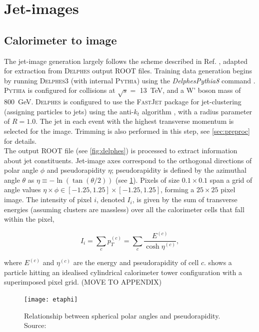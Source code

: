 \documentclass{report}
\newcommand{\pkg}[1]{\textsc{#1}}
\begin{document}
\section{Jet-images}
\subsection{Calorimeter to image}
The jet-image generation largely follows the scheme described in Ref. \cite{de2015jet}, adapted for extraction from \pkg{Delphes} output \pkg{ROOT} files. Training data generation begins by running \pkg{Delphes}3 (with internal \pkg{Pythia}) using the \textit{DelphesPythia8} command \cite{workbook}. \pkg{Pythia} is configured for collisions at $\sqrt{s} =$ \SI{13}{\tera\electronvolt}, and a W' boson mass of \SI{800}{\giga\electronvolt}. \pkg{Delphes} is configured to use the \pkg{FastJet} \cite{fastjet} package for jet-clustering (assigning particles to jets) using the anti-$k_t$ algorithm \cite{antikt}, with a radius parameter of $R=1.0$. The jet in each event with the highest transverse momentum is selected for the image. Trimming is also performed in this step, see \cref{sec:preproc} for details.\\

The output \pkg{ROOT} file (see \cref{fig:delphes}) is processed to extract information about jet constituents. Jet-image axes correspond to the orthogonal directions of polar angle $\phi$ and pseudorapidity $\eta$; pseudorapidity is defined by the azimuthal angle $\theta$ as $\eta \equiv -\ln(\tan(\theta/2))$ (see \cref{fig:etadiag}). Pixels of size $0.1 \times 0.1$ span a grid of angle values $\eta \times \phi \in [-1.25, 1.25]\times [-1.25, 1.25]$, forming a $25\times 25$ pixel image. The intensity of pixel $i$, denoted $I_i$, is given by the sum of transverse energies (assuming clusters are massless) over all the calorimeter cells that fall within the pixel,

\begin{equation}
I_i = \sum_c p_{T}^{(c)} = \sum_c\frac{E^{(c)}}{\cosh{\eta^{(c)}}} ,
\label{eq:intensity}
\end{equation}

where $E^{(c)}$ and $\eta^{(c)}$ are the energy and pseudorapidity of cell $c$.  shows a particle hitting an idealised cylindrical calorimeter tower configuration with a superimposed pixel grid. (MOVE TO APPENDIX)

\begin{figure}[H]
	\centering
	\texttt{[image: etaphi]}
	
	\caption{Relationship between spherical polar angles and pseudorapidity. Source: \cite{etadiag}}
	\label{fig:etadiag}
	
\end{figure}
\end{document}
